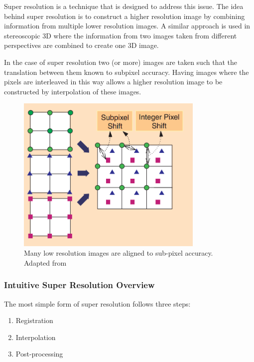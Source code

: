 \documentclass[
  oneside,
  11pt, a4paper,
  footinclude=true,
  headinclude=true,
  cleardoublepage=empty
]{scrbook}
\begin{document}
Super resolution is a technique that is designed to address this issue. The idea behind super resolution is to construct a higher resolution image by combining information from multiple lower resolution images. A similar approach is used in stereoscopic 3D where the information from two images taken from different perspectives are combined to create one 3D image.

In the case of super resolution two (or more) images are taken such that the translation between them known to subpixel accuracy. Having images where the pixels are interleaved in this way allows a higher resolution image to be constructed by interpolation of these images.

\begin{figure}[h]
    \centering
	\includegraphics[width=0.8\textwidth]{images/super_resolution.png}
    \caption{Many low resolution images are aligned to sub-pixel accuracy. Adapted from \cite{superresolution2}}
    \label{fig:superresolution}
\end{figure}

\subsubsection*{Intuitive Super Resolution Overview}
The most simple form of super resolution follows three steps:

\begin{enumerate}
	\item Registration
	\item Interpolation
	\item Post-processing
\end{enumerate}
\end{document}
